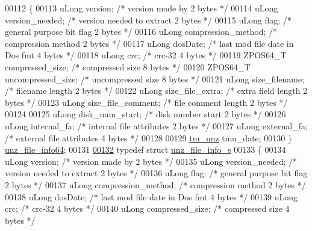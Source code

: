 \begin{DoxyCode}
00112 \{
00113     uLong version;              \textcolor{comment}{/* version made by                 2 bytes */}
00114     uLong version\_needed;       \textcolor{comment}{/* version needed to extract       2 bytes */}
00115     uLong flag;                 \textcolor{comment}{/* general purpose bit flag        2 bytes */}
00116     uLong compression\_method;   \textcolor{comment}{/* compression method              2 bytes */}
00117     uLong dosDate;              \textcolor{comment}{/* last mod file date in Dos fmt   4 bytes */}
00118     uLong crc;                  \textcolor{comment}{/* crc-32                          4 bytes */}
00119     ZPOS64\_T compressed\_size;   \textcolor{comment}{/* compressed size                 8 bytes */}
00120     ZPOS64\_T uncompressed\_size; \textcolor{comment}{/* uncompressed size               8 bytes */}
00121     uLong size\_filename;        \textcolor{comment}{/* filename length                 2 bytes */}
00122     uLong size\_file\_extra;      \textcolor{comment}{/* extra field length              2 bytes */}
00123     uLong size\_file\_comment;    \textcolor{comment}{/* file comment length             2 bytes */}
00124 
00125     uLong disk\_num\_start;       \textcolor{comment}{/* disk number start               2 bytes */}
00126     uLong internal\_fa;          \textcolor{comment}{/* internal file attributes        2 bytes */}
00127     uLong external\_fa;          \textcolor{comment}{/* external file attributes        4 bytes */}
00128 
00129     \hyperlink{structtm__unz__s}{tm\_unz} tmu\_date;
00130 \} \hyperlink{structunz__file__info64__s}{unz\_file\_info64};
00131 
\hyperlink{structunz__file__info__s}{00132} \textcolor{keyword}{typedef} \textcolor{keyword}{struct }\hyperlink{structunz__file__info__s}{unz\_file\_info\_s}
00133 \{
00134     uLong version;              \textcolor{comment}{/* version made by                 2 bytes */}
00135     uLong version\_needed;       \textcolor{comment}{/* version needed to extract       2 bytes */}
00136     uLong flag;                 \textcolor{comment}{/* general purpose bit flag        2 bytes */}
00137     uLong compression\_method;   \textcolor{comment}{/* compression method              2 bytes */}
00138     uLong dosDate;              \textcolor{comment}{/* last mod file date in Dos fmt   4 bytes */}
00139     uLong crc;                  \textcolor{comment}{/* crc-32                          4 bytes */}
00140     uLong compressed\_size;      \textcolor{comment}{/* compressed size                 4 bytes */}

\end{DoxyCode}
